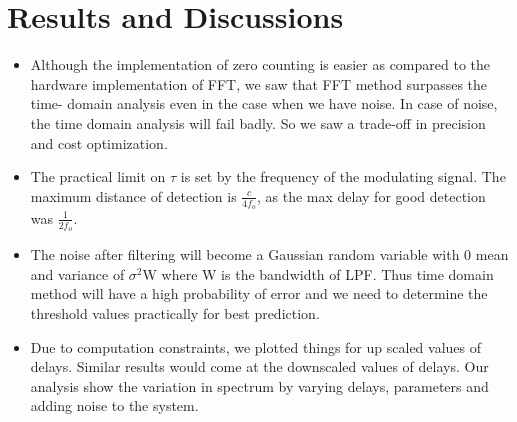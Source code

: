 \documentclass[12pt]{article}
\begin{document}
\section*{Results and Discussions}

\begin{itemize}
    \item Although the implementation of zero counting is easier as compared to the hardware implementation of FFT, we saw that FFT method surpasses the time- domain analysis even in the case when we have noise. In case of noise, the time domain analysis will fail badly. So we saw a trade-off in precision and cost optimization.
    \item The practical limit on $\tau$ is set by the frequency of the modulating signal. The maximum distance of detection is $\frac{c}{4f_o}$, as the max delay for good detection was $\frac{1}{2f_o}$.
    \item The noise after filtering will become a Gaussian random variable with 0 mean and variance of $\sigma^2$W where W is the bandwidth of LPF. Thus time domain method will have a high probability of error and we need to determine the threshold values practically for best prediction. 
    \item Due to computation constraints, we plotted things for up scaled values of delays. Similar results would come at the downscaled values of delays. Our analysis show the variation in spectrum by varying delays, parameters and adding noise to the system.
\end{itemize}
\end{document}
